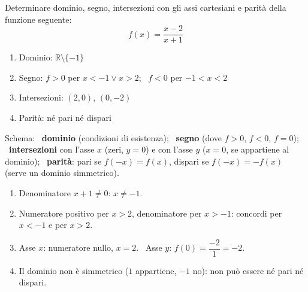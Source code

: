 \begin{question}[ID=1.2, subtitle={Studio di una funzione razionale}, difficulty=facile, tags={funzioni, studio di funzione}]
Determinare dominio, segno, intersezioni con gli assi cartesiani e parità della funzione seguente:
\begin{equation*}
    f(x)=\dfrac{x-2}{x+1}
\end{equation*}
\begin{solution}
\begin{enumerate}
    \item Dominio: $\mathbb{R}\setminus\{-1\}$
    \item Segno: $f>0$ per $x<-1\vee x>2$; \ $f<0$ per $-1<x<2$
    \item Intersezioni: $(2,0)$, $(0,-2)$
    \item Parità: né pari né dispari
\end{enumerate}
\end{solution}
\begin{explanation}
Schema: \ \textbf{dominio} (condizioni di esistenza); \ \textbf{segno} (dove $f>0$, $f<0$, $f=0$); \ \textbf{intersezioni} con l'asse $x$ (zeri, $y=0$) e con l'asse $y$ ($x=0$, se appartiene al dominio); \ \textbf{parità}: pari se $f(-x)=f(x)$, dispari se $f(-x)=-f(x)$ (serve un dominio simmetrico).
\begin{enumerate}
    \item Denominatore $x+1\neq0$: $x\neq-1$.
    \item Numeratore positivo per $x>2$, denominatore per $x>-1$: concordi per $x<-1$ e per $x>2$.
    \item Asse $x$: numeratore nullo, $x=2$. \ Asse $y$: $f(0)=\dfrac{-2}{1}=-2$.
    \item Il dominio non è simmetrico ($1$ appartiene, $-1$ no): non può essere né pari né dispari.
\end{enumerate}
\end{explanation}
\end{question}


